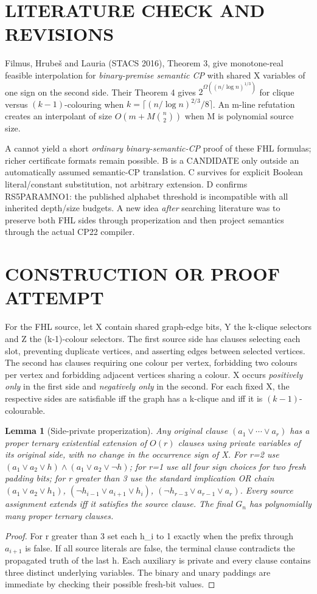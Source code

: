 \documentclass[11pt]{article}
\newtheorem{lemma}[theorem]{Lemma}
\begin{document}
\section{LITERATURE CHECK AND REVISIONS}
Filmus, Hrube\v{s} and Lauria (STACS 2016), Theorem 3, give monotone-real feasible interpolation for \emph{binary-premise semantic CP} with shared X variables of one sign on the second side. Their Theorem 4 gives $2^{\Omega((n/\log n)^{1/3})}$ for clique versus $(k-1)$-colouring when $k=\lceil(n/\log n)^{2/3}/8\rceil$. An m-line refutation creates an interpolant of size $O(m+M\binom n2)$ when M is polynomial source size.

A cannot yield a short \emph{ordinary binary-semantic-CP} proof of these FHL formulas; richer certificate formats remain possible. B is a CANDIDATE only outside an automatically assumed semantic-CP translation. C survives for explicit Boolean literal/constant substitution, not arbitrary extension. D confirms RS5PARAMNO1: the published alphabet threshold is incompatible with all inherited depth/size budgets. A new idea \emph{after} searching literature was to preserve both FHL sides through properization and then project semantics through the actual CP22 compiler.

\section{CONSTRUCTION OR PROOF ATTEMPT}
For the FHL source, let X contain shared graph-edge bits, Y the k-clique selectors and Z the (k-1)-colour selectors. The first source side has clauses selecting each slot, preventing duplicate vertices, and asserting edges between selected vertices. The second has clauses requiring one colour per vertex, forbidding two colours per vertex and forbidding adjacent vertices sharing a colour. X occurs \emph{positively only} in the first side and \emph{negatively only} in the second. For each fixed X, the respective sides are satisfiable iff the graph has a k-clique and iff it is $(k-1)$-colourable.

\begin{lemma}[Side-private properization]
Any original clause $(a_1\vee\cdots\vee a_r)$ has a proper ternary existential extension of $O(r)$ clauses using private variables of its original side, with no change in the occurrence sign of X. For r=2 use $(a_1\vee a_2\vee h)\wedge(a_1\vee a_2\vee\neg h)$; for r=1 use all four sign choices for two fresh padding bits; for r greater than 3 use the standard implication OR chain $(a_1\vee a_2\vee h_1)$, $(\neg h_{i-1}\vee a_{i+1}\vee h_i)$, $(\neg h_{r-3}\vee a_{r-1}\vee a_r)$. Every source assignment extends iff it satisfies the source clause. The final $G_n$ has polynomially many proper ternary clauses.
\end{lemma}
\begin{proof}
For r greater than 3 set each h_i to 1 exactly when the prefix through $a_{i+1}$ is false. If all source literals are false, the terminal clause contradicts the propagated truth of the last h. Each auxiliary is private and every clause contains three distinct underlying variables. The binary and unary paddings are immediate by checking their possible fresh-bit values.
\end{proof}
\end{document}

